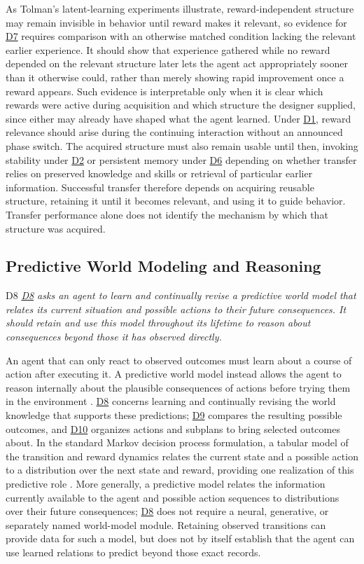 \documentclass[10pt,journal,compsoc]{IEEEtran}
\DeclareRobustCommand{\Dref}[1]{\hyperref[sec:d#1]{D#1}}
\begin{document}
As Tolman's latent-learning experiments illustrate, reward-independent structure may remain invisible in behavior until reward makes it relevant, so evidence for \Dref{7} requires comparison with an otherwise matched condition lacking the relevant earlier experience.
It should show that experience gathered while no reward depended on the relevant structure later lets the agent act appropriately sooner than it otherwise could, rather than merely showing rapid improvement once a reward appears.
Such evidence is interpretable only when it is clear which rewards were active during acquisition and which structure the designer supplied, since either may already have shaped what the agent learned.
Under \Dref{1}, reward relevance should arise during the continuing interaction without an announced phase switch.
The acquired structure must also remain usable until then, invoking stability under \Dref{2} or persistent memory under \Dref{6} depending on whether transfer relies on preserved knowledge and skills or retrieval of particular earlier information.
Successful transfer therefore depends on acquiring reusable structure, retaining it until it becomes relevant, and using it to guide behavior.
Transfer performance alone does not identify the mechanism by which that structure was acquired.

\subsection{Predictive World Modeling and Reasoning}
\label{sec:d8}

\begin{briefbox}[behaviorbrief]{D8}
    \emph{\Dref{8} asks an agent to learn and continually revise a predictive world model that relates its current situation and possible actions to their future consequences.
    It should retain and use this model throughout its lifetime to reason about consequences beyond those it has observed directly.}
\end{briefbox}

\noindent An agent that can only react to observed outcomes must learn about a course of action after executing it.
A predictive world model instead allows the agent to reason internally about the plausible consequences of actions before trying them in the environment \cite{lecun2022}.
\Dref{8} concerns learning and continually revising the world knowledge that supports these predictions; \Dref{9} compares the resulting possible outcomes, and \Dref{10} organizes actions and subplans to bring selected outcomes about.
In the standard Markov decision process formulation, a tabular model of the transition and reward dynamics relates the current state and a possible action to a distribution over the next state and reward, providing one realization of this predictive role \cite{sutton2018}.
More generally, a predictive model relates the information currently available to the agent and possible action sequences to distributions over their future consequences; \Dref{8} does not require a neural, generative, or separately named world-model module.
Retaining observed transitions can provide data for such a model, but does not by itself establish that the agent can use learned relations to predict beyond those exact records.
\end{document}
